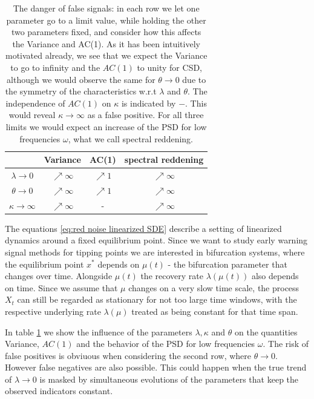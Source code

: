 \documentclass[%
thesis=student,%
coverpage=false,%
titlepage=false,%
headmarks=true, %
english,%
font=libertine, %
math=newpxtx, %
BCOR=5mm,%
coverBCOR=11mm%
]{tumbook}
\begin{document}
\begin{table}[h!]
\centering
\begin{tabular}{|c|c|c|c|}
\hline
& Variance & AC(1) & spectral reddening\\
\hline
$\lambda \rightarrow 0$ & $\nearrow \infty$ & $\nearrow 1$ & $\nearrow \infty$\\
$\theta \rightarrow 0$  & $\nearrow \infty$ & $\nearrow 1$ & $\nearrow \infty$\\
$\kappa \rightarrow \infty$ & $\nearrow \infty$ & - & $\nearrow \infty$\\    
\hline
\end{tabular}
\caption{The danger of false signals: in each row we let one parameter go to a limit value, while holding the other two parameters fixed, and consider how this affects the Variance and AC(1). As it has been intuitively motivated already, we see that we expect the Variance to go to infinity and the $AC(1)$ to unity for CSD, although we would observe the same for $\theta \rightarrow 0$ due to the symmetry of the characteristics w.r.t $\lambda$ and $\theta$. The independence of $AC(1)$ on $\kappa$ is indicated by $-$. This would reveal $\kappa \rightarrow \infty$ as a false positive. For all three limits we would expect an increase of the PSD for low frequencies $\omega$, what we call spectral reddening.}
\label{tab:danger_of_false_signals}
\end{table}

The equations \ref{eq:red noise linearized SDE} describe a setting of linearized dynamics around a fixed equilibrium point. Since we want to study early warning signal methods for tipping points we are interested in bifurcation systems, where the equilibrium point $x^{*}$ depends on $\mu(t)$ - the bifurcation parameter that changes over time. Alongside $\mu(t)$ the recovery rate $\lambda(\mu(t))$ also depends on time. Since we assume that $\mu$ changes on a very slow time scale, the process $X_{t}$ can still be regarded as stationary for not too large time windows, with the respective underlying rate $\lambda(\mu)$ treated as being constant for that time span. 

In table \ref{tab:danger_of_false_signals} we show the influence of the parameters $\lambda, \kappa$ and $\theta$ on the quantities Variance, $AC(1)$ and the behavior of the PSD for low frequencies $\omega$. The risk of false positives is obviuous when considering the second row, where $\theta \rightarrow 0$. However false negatives are also possible. This could happen when the true trend of $\lambda \rightarrow 0$ is masked by simultaneous evolutions of the parameters that keep the observed indicators constant.
\end{document}
